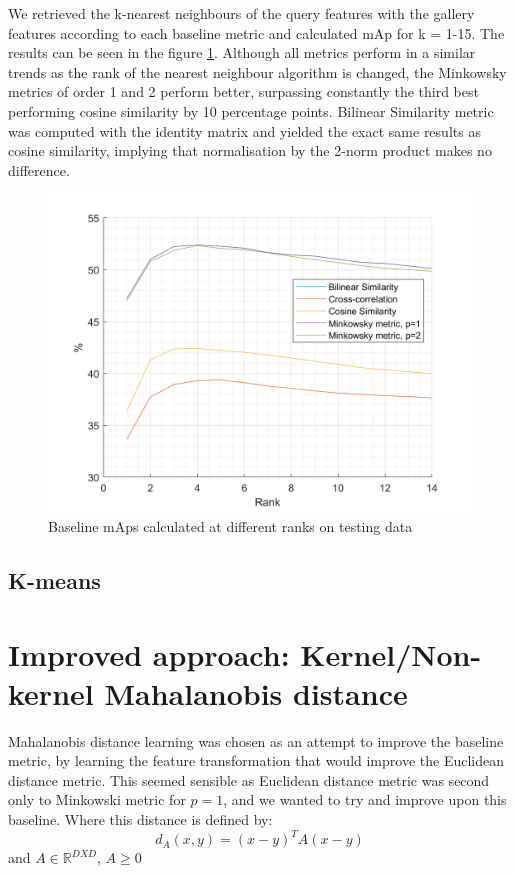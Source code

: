 \documentclass[10pt,technote]{IEEEtran}
\begin{document}
We retrieved the k-nearest neighbours of the query features with the gallery features according to each baseline metric and calculated mAp for k = 1-15. The results can be seen in the figure \ref{fig:baseline_map}. Although all metrics perform in a similar trends as the rank of the nearest neighbour algorithm is changed, the Minkowsky metrics of order 1 and 2 perform better, surpassing constantly the third best performing cosine similarity by 10 percentage points. Bilinear Similarity metric was computed with the identity matrix and yielded the exact same results as cosine similarity, implying that normalisation by the 2-norm product makes no difference.
\begin{figure}
    \centering
    \includegraphics[width=\linewidth]{Graphs/mAp_vs_rank_baseline.png}
    \caption{Baseline mAps calculated at different ranks on testing data}
    \label{fig:baseline_map}
\end{figure}
\subsection{K-means}

\section{Improved approach: Kernel/Non-kernel Mahalanobis distance}
Mahalanobis distance learning was chosen as an attempt to improve the baseline metric, by learning the feature transformation that would improve the Euclidean distance metric. This seemed sensible as Euclidean distance metric was second only to Minkowski metric for $p=1$, and we wanted to try and improve upon this baseline. 
Where this distance is defined by:
\begin{equation}
    d_A(x, y) = (x - y)^TA(x - y)
\end{equation}
and $A \in \mathbb{R}^{DXD}$, $A \ge 0$
\end{document}
